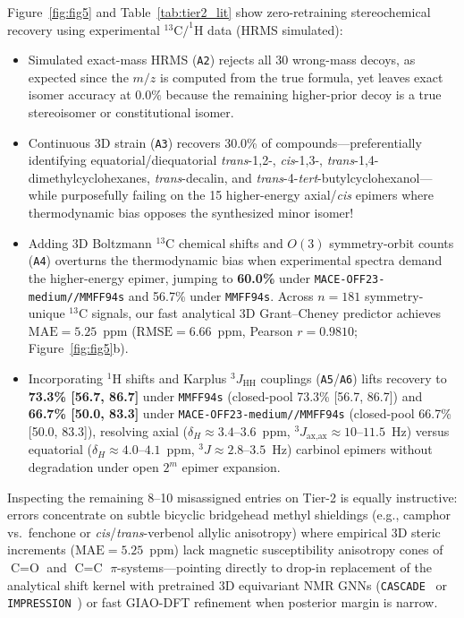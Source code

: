 \documentclass[10pt,twocolumn]{article}
\begin{document}
Figure~\ref{fig:fig5} and Table~\ref{tab:tier2_lit} show zero-retraining stereochemical recovery using experimental $^{13}\text{C}/^{1}\text{H}$ data (HRMS simulated):
\begin{itemize}
  \item Simulated exact-mass HRMS (\texttt{A2}) rejects all 30 wrong-mass decoys, as expected since the $m/z$ is computed from the true formula, yet leaves exact isomer accuracy at $0.0\%$ because the remaining higher-prior decoy is a true stereoisomer or constitutional isomer.
  \item Continuous 3D strain (\texttt{A3}) recovers 30.0\% of compounds---preferentially identifying equatorial/diequatorial \emph{trans}-1,2-, \emph{cis}-1,3-, \emph{trans}-1,4-dimethylcyclohexanes, \emph{trans}-decalin, and \emph{trans}-4-\emph{tert}-butylcyclohexanol---while purposefully failing on the 15 higher-energy axial/\emph{cis} epimers where thermodynamic bias opposes the synthesized minor isomer!
  \item Adding 3D Boltzmann $^{13}\text{C}$ chemical shifts and $O(3)$ symmetry-orbit counts (\texttt{A4}) overturns the thermodynamic bias when experimental spectra demand the higher-energy epimer, jumping to \textbf{60.0\%} under \texttt{MACE-OFF23-medium//MMFF94s} and 56.7\% under \texttt{MMFF94s}. Across $n=181$ symmetry-unique $^{13}\text{C}$ signals, our fast analytical 3D Grant--Cheney predictor achieves $\text{MAE} = 5.25$~ppm ($\text{RMSE} = 6.66$~ppm, Pearson $r = 0.9810$; Figure~\ref{fig:fig5}b).
  \item Incorporating $^{1}\text{H}$ shifts and Karplus $^3J_{\text{HH}}$ couplings (\texttt{A5}/\texttt{A6}) lifts recovery to \textbf{73.3\% [56.7, 86.7]} under \texttt{MMFF94s} (closed-pool 73.3\% [56.7, 86.7]) and \textbf{66.7\% [50.0, 83.3]} under \texttt{MACE-OFF23-medium//MMFF94s} (closed-pool 66.7\% [50.0, 83.3]), resolving axial ($\delta_H \approx 3.4$--$3.6$~ppm, $^3J_{\text{ax,ax}} \approx 10$--$11.5$~Hz) versus equatorial ($\delta_H \approx 4.0$--$4.1$~ppm, $^3J \approx 2.8$--$3.5$~Hz) carbinol epimers without degradation under open $2^m$ epimer expansion.
\end{itemize}
Inspecting the remaining 8--10 misassigned entries on Tier-2 is equally instructive: errors concentrate on subtle bicyclic bridgehead methyl shieldings (e.g., camphor vs.\ fenchone or \emph{cis}/\emph{trans}-verbenol allylic anisotropy) where empirical 3D steric increments ($\text{MAE} = 5.25$~ppm) lack magnetic susceptibility anisotropy cones of $\text{C}=\text{O}$ and $\text{C}=\text{C}$ $\pi$-systems---pointing directly to drop-in replacement of the analytical shift kernel with pretrained 3D equivariant NMR GNNs (\texttt{CASCADE}~\cite{Guan2021CASCADE} or \texttt{IMPRESSION}~\cite{Gerrard2020IMPRESSION}) or fast GIAO-DFT refinement when posterior margin is narrow.
\end{document}
